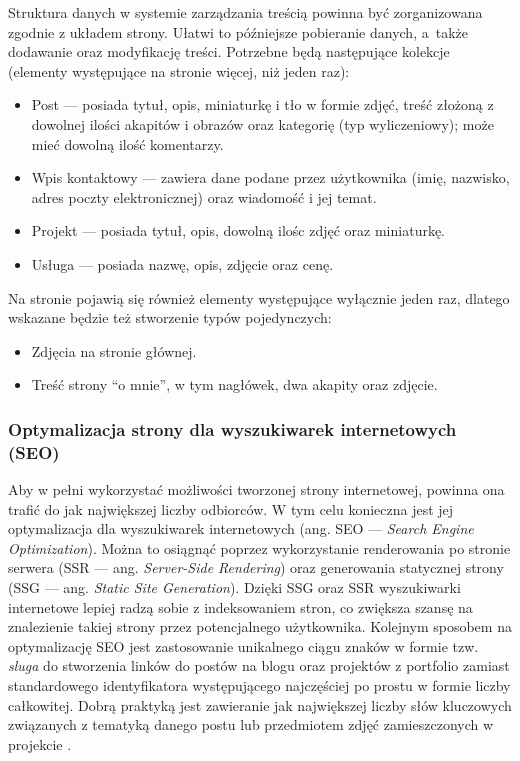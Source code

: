 \documentclass[12pt]{article}
\numberwithin{figure}{section}
\begin{document}
\begin{sloppypar}
Struktura danych w systemie zarządzania treścią powinna być zorganizowana zgodnie z układem strony. Ułatwi to późniejsze pobieranie danych, a~także dodawanie oraz modyfikację treści. Potrzebne będą następujące kolekcje (elementy występujące na stronie więcej, niż jeden raz):
\begin{itemize}
    \item Post --- posiada tytuł, opis, miniaturkę i tło w formie zdjęć, treść złożoną z dowolnej ilości akapitów i obrazów oraz kategorię (typ wyliczeniowy); może mieć dowolną ilość komentarzy.
    \item Wpis kontaktowy --- zawiera dane podane przez użytkownika (imię, nazwisko, adres poczty elektronicznej) oraz wiadomość i jej temat.
    \item Projekt --- posiada tytuł, opis, dowolną ilośc zdjęć oraz miniaturkę.
    \item Usługa --- posiada nazwę, opis, zdjęcie oraz cenę.
\end{itemize}
Na stronie pojawią się również elementy występujące wyłącznie jeden raz, dlatego wskazane będzie też stworzenie typów pojedynczych:
\begin{itemize}
    \item Zdjęcia na stronie głównej.
    \item Treść strony ``o mnie'', w tym nagłówek, dwa akapity oraz zdjęcie.
\end{itemize}

\subsubsection*{Optymalizacja strony dla wyszukiwarek internetowych (SEO)}

Aby w pełni wykorzystać możliwości tworzonej strony internetowej, powinna ona trafić do jak największej liczby odbiorców. W tym celu konieczna jest jej optymalizacja dla wyszukiwarek internetowych (ang. SEO --- \textit{Search Engine Optimization}). Można to osiągnąć poprzez wykorzystanie renderowania po stronie serwera (SSR --- ang. \textit{Server-Side Rendering}) oraz generowania statycznej strony (SSG --- ang. \textit{Static Site Generation}). Dzięki SSG oraz SSR wyszukiwarki internetowe lepiej radzą sobie z indeksowaniem stron, co zwiększa szansę na znalezienie takiej strony przez potencjalnego użytkownika. Kolejnym sposobem na optymalizację SEO jest zastosowanie unikalnego ciągu znaków w formie tzw. \textit{sluga} do stworzenia linków do postów na blogu oraz projektów z portfolio zamiast standardowego identyfikatora występującego najczęściej po prostu w formie liczby całkowitej. Dobrą praktyką jest zawieranie jak największej liczby słów kluczowych związanych z tematyką danego postu lub przedmiotem zdjęć zamieszczonych w projekcie \cite{seo}.


\end{sloppypar}
\end{document}
